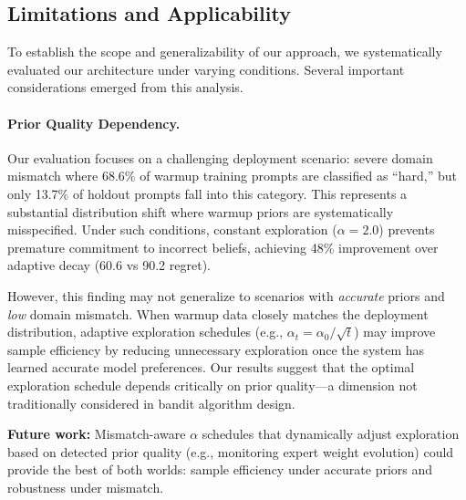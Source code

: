 
\subsection{Limitations and Applicability}
\label{sec:limitations}

To establish the scope and generalizability of our approach, we systematically evaluated our architecture under varying conditions. Several important considerations emerged from this analysis.

\paragraph{Prior Quality Dependency.}
Our evaluation focuses on a challenging deployment scenario: severe domain mismatch where 68.6\% of warmup training prompts are classified as ``hard,'' but only 13.7\% of holdout prompts fall into this category.
This represents a substantial distribution shift where warmup priors are systematically misspecified.
Under such conditions, constant exploration ($\alpha=2.0$) prevents premature commitment to incorrect beliefs, achieving 48\% improvement over adaptive decay (60.6 vs 90.2 regret).

However, this finding may not generalize to scenarios with \emph{accurate} priors and \emph{low} domain mismatch.
When warmup data closely matches the deployment distribution, adaptive exploration schedules (e.g., $\alpha_t = \alpha_0/\sqrt{t}$) may improve sample efficiency by reducing unnecessary exploration once the system has learned accurate model preferences.
Our results suggest that the optimal exploration schedule depends critically on prior quality---a dimension not traditionally considered in bandit algorithm design.

\textbf{Future work:}
Mismatch-aware $\alpha$ schedules that dynamically adjust exploration based on detected prior quality (e.g., monitoring expert weight evolution) could provide the best of both worlds: sample efficiency under accurate priors and robustness under mismatch.


